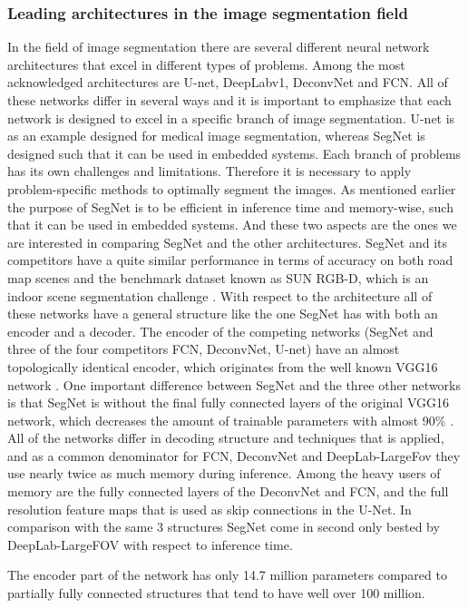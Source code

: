 \documentclass{article}
\begin{document}
\subsubsection{Leading architectures in the image segmentation field}
In the field of image segmentation there are several different neural network architectures that excel in different types of problems. Among the most acknowledged architectures are U-net, DeepLabv1, DeconvNet and FCN. 
All of these networks differ in several ways and it is important to emphasize that each network is designed to excel in a specific branch of image segmentation. U-net is as an example designed for medical image segmentation, whereas SegNet is designed such that it can be used in embedded systems. Each branch of problems has its own challenges and limitations. Therefore it is necessary to apply problem-specific methods to optimally segment the images. 
As mentioned earlier the purpose of SegNet is to be efficient in inference time and memory-wise, such that it can be used in embedded systems. And these two aspects are the ones we are interested in comparing SegNet and the other architectures. 
SegNet and its competitors have a quite similar performance in terms of accuracy on both road map scenes and the benchmark dataset known as SUN RGB-D, which is an indoor scene segmentation challenge \cite{seg}. 
With respect to the architecture all of these networks have a general structure like the one SegNet has with both an encoder and a decoder. The encoder of the competing networks (SegNet and three of the four competitors FCN, DeconvNet, U-net) have an almost topologically identical encoder, which originates from the well known VGG16 network \cite{VGG16}. One important difference between SegNet and the three other networks is that SegNet is without the final fully connected layers of the original VGG16 network, which decreases the amount of trainable parameters with almost 90\% \cite{seg}. 
All of the networks differ in decoding structure and techniques that is applied, and as a common denominator for FCN, DeconvNet and DeepLab-LargeFov they use nearly twice as much memory during inference. Among the heavy users of memory are the fully connected layers of the DeconvNet and FCN, and the full resolution feature maps that is used as skip connections in the U-Net. In comparison with the same 3 structures SegNet come in second only bested by DeepLab-LargeFOV with respect to inference time.


The encoder part of the network has only 14.7 million parameters compared to partially fully connected structures that tend to have well over 100 million. \cite{seg}
\end{document}
